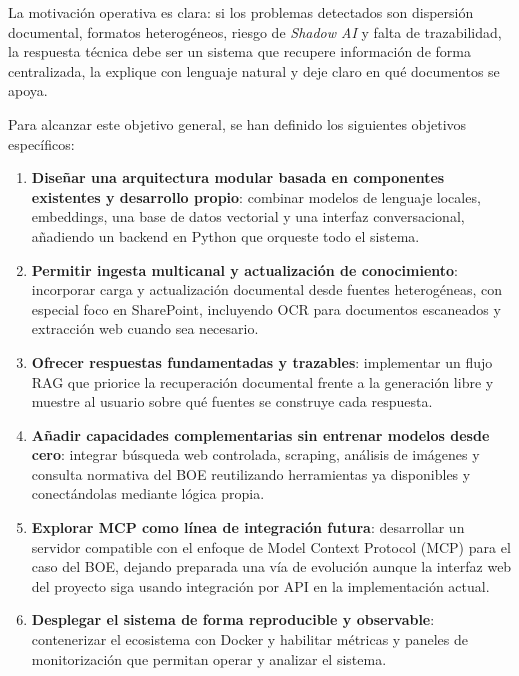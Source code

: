 La motivación operativa es clara: si los problemas detectados son dispersión documental, formatos heterogéneos, riesgo de \textit{Shadow AI} y falta de trazabilidad, la respuesta técnica debe ser un sistema que recupere información de forma centralizada, la explique con lenguaje natural y deje claro en qué documentos se apoya.

Para alcanzar este objetivo general, se han definido los siguientes objetivos específicos:

\begin{enumerate}
    \item \textbf{Diseñar una arquitectura modular basada en componentes existentes y desarrollo propio}: combinar modelos de lenguaje locales, embeddings, una base de datos vectorial y una interfaz conversacional, añadiendo un backend en Python que orqueste todo el sistema.

    \item \textbf{Permitir ingesta multicanal y actualización de conocimiento}: incorporar carga y actualización documental desde fuentes heterogéneas, con especial foco en SharePoint, incluyendo OCR para documentos escaneados y extracción web cuando sea necesario.

    \item \textbf{Ofrecer respuestas fundamentadas y trazables}: implementar un flujo RAG que priorice la recuperación documental frente a la generación libre y muestre al usuario sobre qué fuentes se construye cada respuesta.

    \item \textbf{Añadir capacidades complementarias sin entrenar modelos desde cero}: integrar búsqueda web controlada, scraping, análisis de imágenes y consulta normativa del BOE reutilizando herramientas ya disponibles y conectándolas mediante lógica propia.

    \item \textbf{Explorar MCP como línea de integración futura}: desarrollar un servidor compatible con el enfoque de Model Context Protocol (MCP) \cite{anthropic2024mcp} para el caso del BOE, dejando preparada una vía de evolución aunque la interfaz web del proyecto siga usando integración por API en la implementación actual.

    \item \textbf{Desplegar el sistema de forma reproducible y observable}: contenerizar el ecosistema con Docker y habilitar métricas y paneles de monitorización que permitan operar y analizar el sistema.
\end{enumerate}

